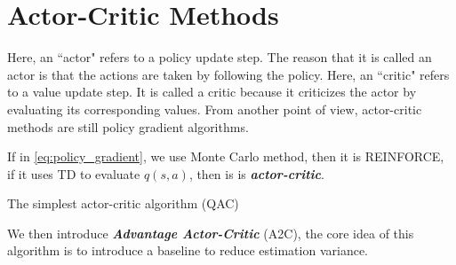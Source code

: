 \documentclass[10pt]{elegantbook}
\newcommand{\mydefination}[1]{\textbf{\textit{\textcolor{structurecolor}{#1}}}}
\begin{document}
\vspace{\baselineskip}



\section{Actor-Critic Methods}
Here, an ``actor" refers to a policy update step. The reason that it is called an actor is that the
actions are taken by following the policy. Here, an ``critic" refers to a value update step. It
is called a critic because it criticizes the actor by evaluating its corresponding values. From
another point of view, actor-critic methods are still policy gradient algorithms. 

If in \ref{eq:policy_gradient}, we use Monte Carlo method, then it is REINFORCE, if it uses TD to evaluate $q(s, a)$, then is is
\mydefination{actor-critic}.

\vspace{\baselineskip}

\begin{algorithm}[H]
\caption{The simplest actor-critic algorithm (QAC)}

\end{algorithm}

\vspace{\baselineskip}

We then introduce \mydefination{Advantage Actor-Critic} (A2C), the core idea of this algorithm
is to introduce a baseline to reduce estimation variance.
\end{document}
